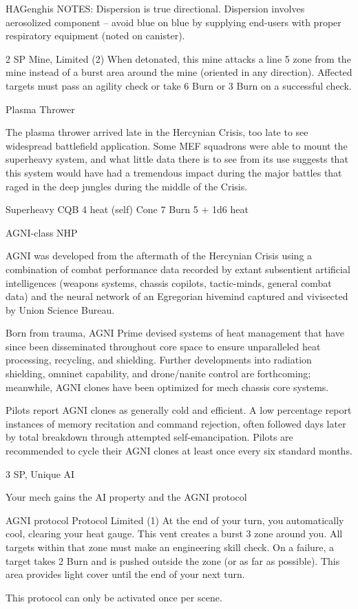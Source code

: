 \begin{mech}{HA}{Genghis}
NOTES: Dispersion is true directional. Dispersion involves aerosolized component -- avoid blue on blue by supplying end-users with proper respiratory equipment (noted on canister).

2 SP
Mine, Limited (2)
When detonated, this mine attacks a line 5 zone from the mine instead of a burst area around the mine (oriented in any direction). Affected targets must pass an agility check or take 6 Burn or 3 Burn on a successful check.


Plasma Thrower

The plasma thrower arrived late in the Hercynian Crisis, too late to see widespread battlefield application. Some MEF squadrons were able to mount the superheavy system, and what little data there is to see from its use suggests that this system would have had a tremendous impact during the major battles that raged in the deep jungles during the middle of the Crisis.

Superheavy CQB
4 heat (self)
Cone 7
Burn 5 + 1d6 heat


AGNI-class NHP

AGNI was developed from the aftermath of the Hercynian Crisis using a combination of combat performance data recorded by extant subsentient artificial intelligences (weapons systems, chassis copilots, tactic-minds, general combat data) and the neural network of an Egregorian hivemind captured and vivisected by Union Science Bureau.

Born from trauma, AGNI Prime devised systems of heat management that have since been disseminated throughout core space to ensure unparalleled heat processing, recycling, and shielding. Further developments into radiation shielding, omninet capability, and drone/nanite control are forthcoming; meanwhile, AGNI clones have been optimized for mech chassis core systems.

Pilots report AGNI clones as generally cold and efficient. A low percentage report instances of memory recitation and command rejection, often followed days later by total breakdown through attempted self-emancipation. Pilots are recommended to cycle their AGNI clones at least once every six standard months.

3 SP, Unique
AI

Your mech gains the AI property and the AGNI protocol

         AGNI protocol
	     Protocol
         Limited (1)
         At the end of your turn, you automatically cool, clearing your heat gauge. This vent creates a burst 3 zone around you. All targets within that zone must make an engineering skill check. On a failure, a target takes 2 Burn and is pushed outside the zone (or as far as possible). This area provides light cover until the end of your next turn.

         This protocol can only be activated once per scene.
\end{mech}
